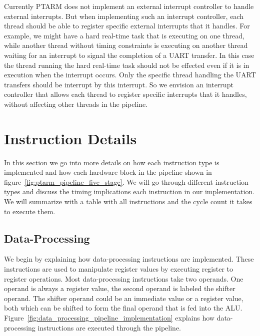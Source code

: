 Currently PTARM does not implement an external interrupt controller to handle external interrupts. 
But when implementing such an interrupt controller, each thread should be able to register specific external interrupts that it handles.
For example, we might have a hard real-time task that is executing on one thread, while another thread without timing constraints is executing on another thread waiting for an interrupt to signal the completion of a UART transfer.
In this case the thread running the hard real-time task should not be effected even if it is in execution when the interrupt occurs.
Only the specific thread handling the UART transfers should be interrupt by this interrupt.  
So we envision an interrupt controller that allows each thread to register specific interrupts that it handles, without affecting other threads in the pipeline.  

\section{Instruction Details}
\label{sec:ptarm_instructions}
In this section we go into more details on how each instruction type is implemented and how each hardware block in the pipeline shown in figure~\ref{fig:ptarm_pipeline_five_stage}. 
We will go through different instruction types and discuss the timing implications each instruction in our implementation.
We will summarize with a table with all instructions and the cycle count it takes to execute them.
   
\subsection{Data-Processing}
We begin by explaining how data-processing instructions are implemented.
These instructions are used to manipulate register values by executing register to register operations. 
Most data-processing instructions take two operands.
One operand is always a register value, the second operand is labeled the shifter operand. 
The shifter operand could be an immediate value or a register value, both which can be shifted to form the final operand that is fed into the ALU.
Figure~\ref{fig:data_processing_pipeline_implementation} explains how data-processing instructions are executed through the pipeline.

